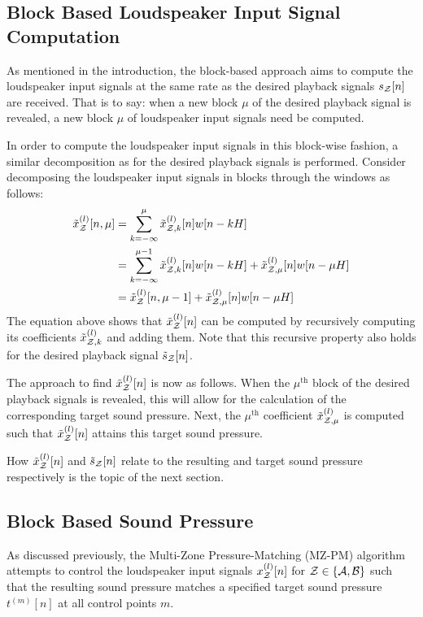 \subsection{Block Based Loudspeaker Input Signal Computation}
As mentioned in the introduction, the block-based approach aims to compute the loudspeaker input signals at the same
rate as the desired playback signals $s_{\mathcal{Z}}[n]$ are received.
That is to say: when a new block $\mu$ of the desired playback signal is revealed, a new block $\mu$ of 
loudspeaker input signals need be computed.

In order to compute the loudspeaker input signals in this block-wise fashion, 
a similar decomposition as for the desired playback signals is performed.
Consider decomposing the loudspeaker input signals in blocks through the windows as follows:
\begin{align}
    \tilde{x}^{(l)}_{\mathcal{Z}}[n, \mu] &= \sum_{k=-\infty}^{\mu} \tilde{x}^{(l)}_{\mathcal{Z},k}[n]w[n - kH] \\
                           &= \sum_{k=-\infty}^{\mu - 1} \tilde{x}^{(l)}_{\mathcal{Z},k}[n]w[n - kH] 
                                + \tilde{x}^{(l)}_{\mathcal{Z},\mu}[n]w[n - \mu H] \\
                           &= \tilde{x}^{(l)}_{\mathcal{Z}}[n, \mu - 1] + \tilde{x}^{(l)}_{\mathcal{Z},\mu}[n]w[n - \mu H]
\end{align}
The equation above shows that $\tilde{x}^{(l)}_{\mathcal{Z}}[n]$ can be computed by recursively computing its coefficients
$\tilde{x}^{(l)}_{\mathcal{Z},k}$ and adding them.
Note that this recursive property also holds for the desired playback signal $\tilde{s}_{\mathcal{Z}}[n]$. 

The approach to find $\tilde{x}^{(l)}_{\mathcal{Z}}[n] $ is now as follows.
When the $\mu^\text{th}$ block of the desired playback signals is revealed, this will allow for the calculation of the 
corresponding target sound pressure.
Next, the $\mu^{\text{th}}$ coefficient $\tilde{x}^{(l)}_{\mathcal{Z},\mu}$ is computed such that $\tilde{x}^{(l)}_{\mathcal{Z}}[n]$
attains this target sound pressure.

How $\tilde{x}^{(l)}_{\mathcal{Z}}[n]$ and $\tilde{s}_{\mathcal{Z}}[n]$ relate to the resulting and target sound pressure respectively
is the topic of the next section.

\subsection{Block Based Sound Pressure}
As discussed previously, the Multi-Zone Pressure-Matching (MZ-PM) algorithm attempts to 
control the loudspeaker input signals 
$x^{(l)}_{\mathcal{Z}}[n]$ for $\mathcal{Z}\in\left\{\mathcal{A},\mathcal{B}\right\}$ such that the resulting sound pressure matches a 
specified target sound pressure $t^{(m)}[n]$ at all control points $m$.

